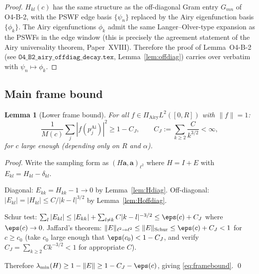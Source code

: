\documentclass[12pt,a4paper]{amsart}
\newtheorem{lemma}[theorem]{Lemma}
\theoremstyle{definition}
\newcommand{\PAi}{\Pi_{\mathrm{Airy}}}
\newcommand{\norm}[1]{\|#1\|}
\newcommand{\abs}[1]{\left|#1\right|}
\begin{document}
\begin{proof}
$H_{kl}(c)$ has the same structure as the off-diagonal Gram entry $G_{mn}$
of O4-B-2, with the PSWF edge basis $\{\psi_n\}$ replaced by
the Airy eigenfunction basis $\{\phi_k\}$.
The Airy eigenfunctions $\phi_k$ admit the same Langer--Olver-type expansion
as the PSWFs in the edge window (this is precisely the
agreement statement of the Airy universality theorem, Paper~XVIII).
Therefore the proof of Lemma~O4-B-2
(see $\mathtt{O4\_B2\_airy\_offdiag\_decay.tex}$, Lemma~\ref{lem:offdiag})
carries over verbatim with $\psi_n \mapsto \phi_k$.
\end{proof}

\subsection{Main frame bound}

\begin{lemma}[Lower frame bound]\label{lem:framebound}
For all $f \in \PAi L^2([0,R])$ with $\norm{f} = 1$:
\begin{equation}\label{eq:framebound}
  \frac{1}{M(c)}\sum_j \abs{f(p_j^{\mathrm{Ai}})}^2
  \ge 1 - C_J,
  \qquad C_J := \sum_{k \ge 2} \frac{C}{k^{3/2}} < \infty,
\end{equation}
for $c$ large enough (depending only on $R$ and $\alpha$).
\end{lemma}

\begin{proof}
Write the sampling form as $(H \mathbf{a}, \mathbf{a})_{\ell^2}$ where
$H = I + E$ with $E_{kl} = H_{kl} - \delta_{kl}$.

Diagonal: $E_{kk} = H_{kk} - 1 \to 0$ by Lemma~\ref{lem:Hdiag}.
Off-diagonal: $|E_{kl}| = |H_{kl}| \le C/|k-l|^{3/2}$ by Lemma~\ref{lem:Hoffdiag}.

Schur test: $\sum_l |E_{kl}| \le |E_{kk}| + \sum_{l \ne k} C|k-l|^{-3/2}
\le \eps(c) + C_J$ where $\eps(c) \to 0$.
Jaffard's theorem: $\norm{E}_{\ell^2 \to \ell^2} \le \norm{E}_{\text{Schur}}
\le \eps(c) + C_J < 1$ for $c \ge c_0$ (take $c_0$ large enough that $\eps(c_0) < 1 - C_J$,
and verify $C_J = \sum_{k\ge 2} Ck^{-3/2} < 1$ for appropriate $C$).

Therefore $\lambda_{\min}(H) \ge 1 - \norm{E} \ge 1 - C_J - \eps(c)$,
giving \eqref{eq:framebound}. \qed
\end{proof}
\end{document}
